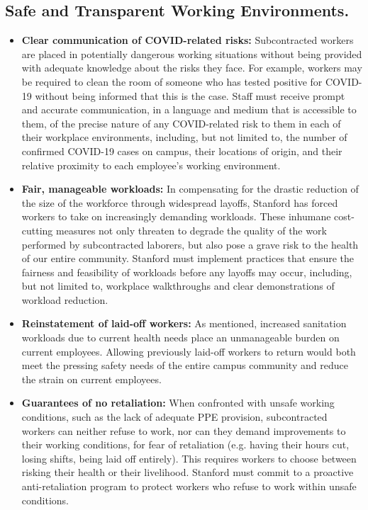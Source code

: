 \documentclass[12pt, titlepage, letterpaper]{article}
\begin{document}
\subsection*{Safe and Transparent Working Environments.}
%
\begin{itemize}
    \item
    \textbf{Clear communication of COVID-related risks:} Subcontracted workers are placed in potentially dangerous working situations without being provided with adequate knowledge about the risks they face. For example, workers may be required to clean the room of someone who has tested positive for COVID-19 without being informed that this is the case. Staff must receive prompt and accurate communication, in a language and medium that is accessible to them, of the precise nature of any COVID-related risk to them in each of their workplace environments, including, but not limited to, the number of confirmed COVID-19 cases on campus, their locations of origin, and their relative proximity to each employee’s working environment.
    
    
    \item
    \textbf{Fair, manageable workloads:} In compensating for the drastic reduction of the size of the workforce through widespread layoffs, Stanford has forced workers to take on increasingly demanding workloads. These inhumane cost-cutting measures not only threaten to degrade the quality of the work performed by subcontracted laborers, but also pose a grave risk to the health of our entire community. Stanford must implement practices that ensure the fairness and feasibility of workloads before any layoffs may occur, including, but not limited to, workplace walkthroughs and clear demonstrations of workload reduction. 
    
    \item
    \textbf{Reinstatement of laid-off workers:} As mentioned, increased sanitation workloads due to current health needs place an unmanageable burden on current employees. Allowing previously laid-off workers to return would both meet the pressing safety needs of the entire campus community and reduce the strain on  current employees. 
    
    \item
    \textbf{Guarantees of no retaliation:} When confronted with unsafe working conditions, such as the lack of adequate PPE provision, subcontracted workers can neither refuse to work, nor can they demand improvements to their working conditions, for fear of retaliation (e.g. having their hours cut, losing shifts, being laid off entirely). This requires workers to choose between risking their health or their livelihood. Stanford must commit to a proactive anti-retaliation program to protect workers who refuse to work within unsafe conditions. 
    
    \end{itemize}
\end{document}
